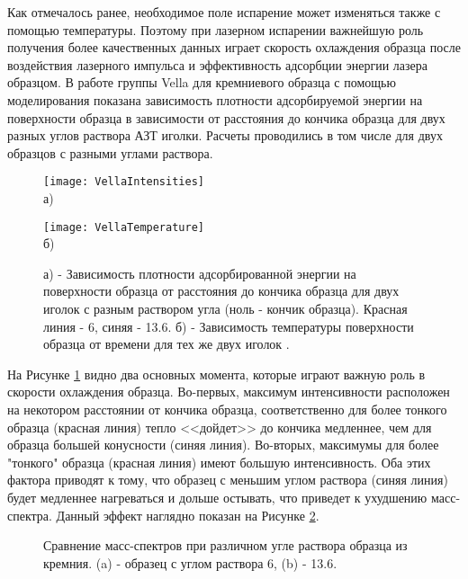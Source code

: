 Как отмечалось ранее, необходимое поле испарение может изменяться также с помощью температуры. Поэтому при лазерном испарении важнейшую роль получения более качественных данных играет скорость охлаждения образца после воздействия лазерного импульса и эффективность адсорбции энергии лазера образцом. В работе группы Vella \cite{Vella18} для кремниевого образца с помощью моделирования показана зависимость плотности адсорбируемой энергии на поверхности образца в зависимости от расстояния до кончика образца для двух разных углов раствора АЗТ иголки. Расчеты проводились в том числе для двух образцов с разными углами раствора.

\begin{figure}[htb]
	\begin{minipage}[b]{0.49\textwidth}\centering
		\texttt{[image: VellaIntensities]} \\ а)
	\end{minipage}
	\begin{minipage}[b]{0.49\textwidth}\centering
		\texttt{[image: VellaTemperature]} \\ б)
	\end{minipage}
	\caption{а) - Зависимость плотности адсорбированной энергии на поверхности образца от расстояния до кончика образца для двух иголок с разным раствором угла (ноль - кончик образца). Красная линия - 6\textdegree, синяя - 13.6\textdegree. б) - Зависимость температуры поверхности образца от времени для тех же двух иголок \cite{Vella18}.}
	\label{fig:VellaIntensities}
\end{figure}


На Рисунке \cref{fig:VellaIntensities} видно два основных момента, которые играют важную роль в скорости охлаждения образца. Во-первых, максимум интенсивности расположен на некотором расстоянии от кончика образца, соответственно для более тонкого образца (красная линия) тепло <<дойдет>> до кончика медленнее, чем для образца большей конусности (синяя линия). Во-вторых, максимумы для более "тонкого" образца (красная линия) имеют большую интенсивность. Оба этих фактора приводят к тому, что образец с меньшим углом раствора (синяя линия) будет медленнее нагреваться и дольше остывать, что приведет к ухудшению масс-спектра. Данный эффект наглядно показан на Рисунке \cref{fig:VellaSpectors}.

\begin{figure}[htb]
	\caption{Сравнение масс-спектров при различном угле раствора образца из кремния. (a) - образец с углом раствора 6\textdegree, (b) - 13.6\textdegree  \cite{Vella18}.}
	\label{fig:VellaSpectors}
\end{figure}

